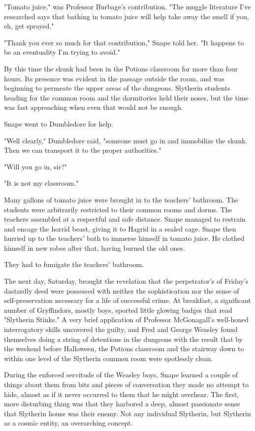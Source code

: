 "Tomato juice," was Professor Burbage's contribution. "The muggle literature I've researched says that bathing in tomato juice will help take away the smell if you, eh, get sprayed."

"Thank you ever so much for that contribution," Snape told her. "It happens to be an eventuality I'm trying to avoid."

By this time the skunk had been in the Potions classroom for more than four hours. Its presence was evident in the passage outside the room, and was beginning to permeate the upper areas of the dungeons. Slytherin students heading for the common room and the dormitories held their noses, but the time was fast approaching when even that would not be enough.

Snape went to Dumbledore for help.

"Well clearly," Dumbledore said, "someone must go in and immobilize the skunk. Then we can transport it{\el} to the proper authorities."

"Will you go in, sir?"

"It is not my classroom."

Many gallons of tomato juice were brought in to the teachers' bathroom. The students were arbitrarily restricted to their common rooms and dorms. The teachers assembled at a respectful and safe distance. Snape managed to restrain and encage the horrid beast, giving it to Hagrid in a sealed cage. Snape then hurried up to the teachers' bath to immerse himself in tomato juice. He clothed himself in new robes after that, having burned the old ones.

They had to fumigate the teachers' bathroom.

The next day, Saturday, brought the revelation that the perpetrator's of Friday's dastardly deed were possessed with neither the sophistication nor the sense of self-preservation necessary for a life of successful crime. At breakfast, a significant number of Gryffindors, mostly boys, sported little glowing badges that read "Slytherin Stinks." A very brief application of Professor McGonagall's well-honed interrogatory skills uncovered the guilty, and Fred and George Weasley found themselves doing a string of detentions in the dungeons with the result that by the weekend before Halloween, the Potions classroom and the stairway down to within one level of the Slytherin common room were spotlessly clean.

During the enforced servitude of the Weasley boys, Snape learned a couple of things about them from bits and pieces of conversation they made no attempt to hide, almost as if it never occurred to them that he might overhear. The first, more disturbing thing was that they harbored a deep, almost passionate sense that Slytherin house was their enemy. Not any individual Slytherin, but Slytherin as a cosmic entity, an overarching concept.

